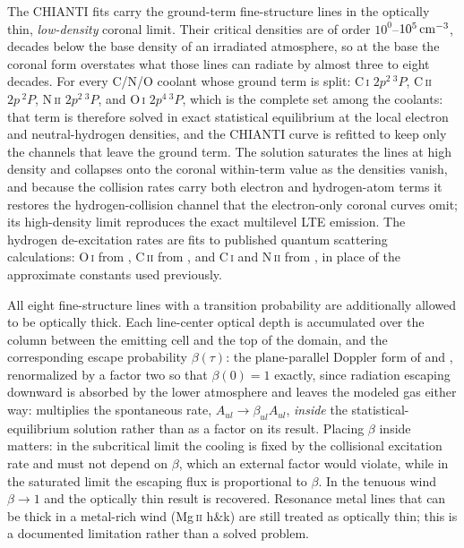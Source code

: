 \documentclass[twocolumn]{aastex702}
\begin{document}
The CHIANTI fits carry the ground-term fine-structure lines in the optically thin,
\emph{low-density} coronal limit. Their critical densities are of order
$10^{0}$--$10^{5}\,{\rm cm^{-3}}$, decades below the base density of an irradiated
atmosphere, so at the base the coronal form overstates what those lines can radiate by
almost three to eight decades. For every C/N/O coolant whose ground term is split:
\mbox{C\,\textsc{i}} $2p^2\,^3P$, \mbox{C\,\textsc{ii}} $2p\,^2P$, \mbox{N\,\textsc{ii}}
$2p^2\,^3P$, and \mbox{O\,\textsc{i}} $2p^4\,^3P$, which is the complete set among the
coolants: that term is therefore solved in exact statistical equilibrium at the local
electron and neutral-hydrogen densities, and the CHIANTI curve is refitted to keep only the
channels that leave the ground term. The solution saturates the lines at high density and
collapses onto the coronal within-term value as the densities vanish, and because the
collision rates carry both electron and hydrogen-atom terms it restores the
hydrogen-collision channel that the electron-only coronal curves omit; its high-density
limit reproduces the exact multilevel LTE emission. The hydrogen de-excitation rates are
fits to published quantum scattering calculations: \mbox{O\,\textsc{i}} from
\citet{Abrahamsson2007}, \mbox{C\,\textsc{ii}} from \citet{Barinovs2005}, and
\mbox{C\,\textsc{i}} and \mbox{N\,\textsc{ii}} from \citet{YanBabb2023}, in place of the
approximate constants used previously.

All eight fine-structure lines with a transition probability are additionally allowed to be
optically thick. Each line-center optical depth is accumulated over the column between the
emitting cell and the top of the domain, and the corresponding escape probability
$\beta(\tau)$: the plane-parallel Doppler form of \citet{HollenbachMcKee1979}
and \citet{deJong1980}, renormalized by a factor two so that $\beta(0)=1$ exactly, since
radiation escaping downward is absorbed by the lower atmosphere and leaves the modeled gas
either way: multiplies the spontaneous rate, $A_{ul}\to\beta_{ul} A_{ul}$, \emph{inside}
the statistical-equilibrium solution rather than as a factor on its result. Placing $\beta$
inside matters: in the subcritical limit the cooling is fixed by the collisional excitation
rate and must not depend on $\beta$, which an external factor would violate, while in the
saturated limit the escaping flux is proportional to $\beta$. In the tenuous wind
$\beta\to1$ and the optically thin result is recovered.
Resonance metal lines that can be thick in a metal-rich wind
(\mbox{Mg\,\textsc{ii}} h\&k) are still treated as optically thin; this is a documented
limitation rather than a solved problem.
\end{document}
